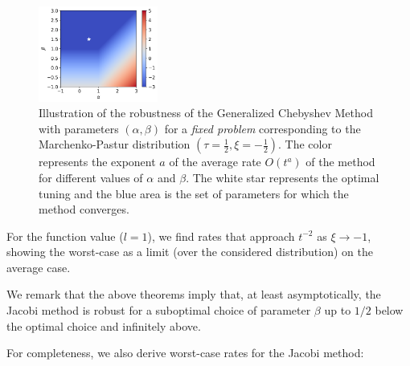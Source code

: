 \documentclass{article}
\begin{document}
\begin{figure}
    \vspace{-.8cm}
    \centering
    \includegraphics[width=0.35\textwidth]{new_imgs/cmap.png}
    \caption{
    \small Illustration of the robustness of the Generalized Chebyshev Method with parameters $(\alpha,\beta)$ for a \emph{fixed problem} corresponding to the Marchenko-Pastur distribution $(\tau=\tfrac12,\xi=-\tfrac12)$. The 
    color represents the exponent $a$ of the average rate $O(t^{a})$ of the method for different values of $\alpha$ and $\beta$. The white star represents the optimal tuning and the blue area is the set of parameters for which the method converges.}
    \vspace{-1.4cm}
\end{figure}


For the function value ($l=1$), we find rates that approach $t^{-2}$ as $\xi\rightarrow -1$, showing the worst-case as a limit (over the considered distribution) on the average case.

We remark that the above theorems imply that, at least asymptotically, the Jacobi method is robust for a suboptimal choice of parameter $\beta$ up to $1/2$ below the optimal choice and infinitely above. 


For completeness, we also derive worst-case rates for the Jacobi method:
\vspace{1.5 cm}
\end{document}

